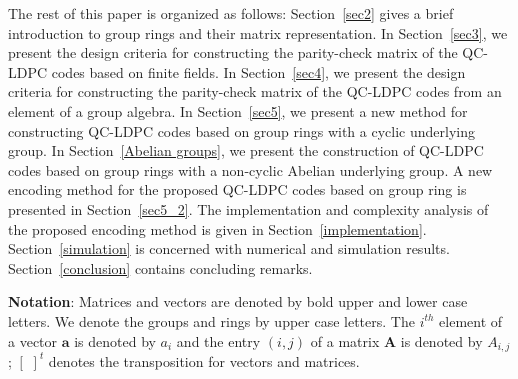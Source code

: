 \documentclass[journal,draftclsnofoot,onecolumn,12pt,twoside]{IEEEtran}
\begin{document}
The rest of this paper is organized as follows: Section~\ref{sec2} gives  a brief introduction to  group rings and their matrix representation. In Section~\ref{sec3}, we present the design criteria for constructing the parity-check matrix of the QC-LDPC codes based on finite fields.  In Section~\ref{sec4}, we present the design criteria for constructing the parity-check matrix of the QC-LDPC codes from an element of a group algebra. In Section~\ref{sec5}, we present a new method for constructing QC-LDPC codes based on group rings with a cyclic underlying group. In Section~\ref{Abelian groups}, we present the construction of QC-LDPC codes based on  group rings with a non-cyclic Abelian underlying group. A new encoding method for the proposed  QC-LDPC codes  based on group ring is presented in Section~\ref{sec5_2}.
The implementation and  complexity analysis of the proposed encoding method is given in Section~\ref{implementation}.
Section~\ref{simulation} is concerned with  numerical and  simulation results.  Section~\ref{conclusion} contains  concluding remarks.



\textbf{Notation}: Matrices and vectors are denoted by bold upper
and lower case letters. We denote the groups and rings  by upper case letters. The $i^{th}$ element of a vector $\mathbf{a}$ is denoted
by $a_i$ and the  entry $(i,j)$ of a matrix $\mathbf{A}$ is denoted by
$A_{i,j}$; $[\,\,]^t$ denotes the transposition for vectors and matrices.
\end{document}
